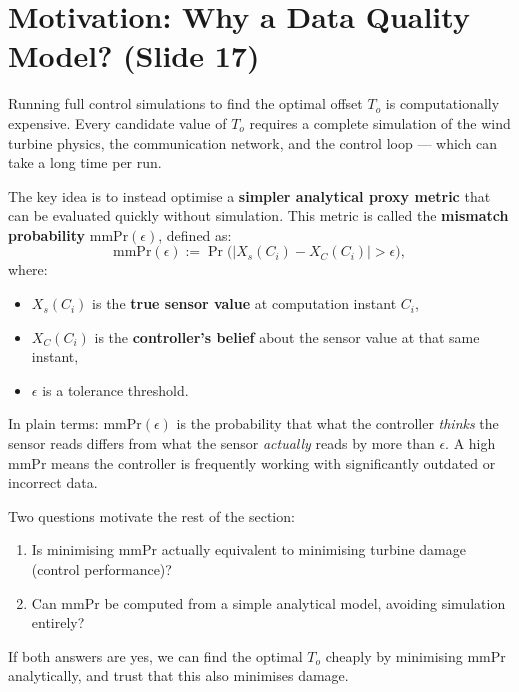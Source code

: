 \section{Motivation: Why a Data Quality Model? (Slide 17)}
 
Running full control simulations to find the optimal offset $T_o$ is
computationally expensive. Every candidate value of $T_o$ requires a
complete simulation of the wind turbine physics, the communication network,
and the control loop --- which can take a long time per run.
 
The key idea is to instead optimise a \textbf{simpler analytical proxy
metric} that can be evaluated quickly without simulation. This metric is
called the \textbf{mismatch probability} $\mathrm{mmPr}(\epsilon)$, defined
as:
\[
  \mathrm{mmPr}(\epsilon)
    := \Pr\!\bigl(|X_s(C_i) - X_C(C_i)| > \epsilon\bigr),
\]
where:
\begin{itemize}[leftmargin=2em]
  \item $X_s(C_i)$ is the \textbf{true sensor value} at computation
        instant $C_i$,
  \item $X_C(C_i)$ is the \textbf{controller's belief} about the sensor
        value at that same instant,
  \item $\epsilon$ is a tolerance threshold.
\end{itemize}
 
In plain terms: $\mathrm{mmPr}(\epsilon)$ is the probability that what the
controller \emph{thinks} the sensor reads differs from what the sensor
\emph{actually} reads by more than $\epsilon$. A high $\mathrm{mmPr}$ means
the controller is frequently working with significantly outdated or incorrect
data.
 
Two questions motivate the rest of the section:
 
\begin{enumerate}[leftmargin=2em]
  \item Is minimising $\mathrm{mmPr}$ actually equivalent to minimising
        turbine damage (control performance)?
  \item Can $\mathrm{mmPr}$ be computed from a simple analytical model,
        avoiding simulation entirely?
\end{enumerate}
 
\begin{insightbox}
If both answers are yes, we can find the optimal $T_o$ cheaply by minimising
$\mathrm{mmPr}$ analytically, and trust that this also minimises damage.
\end{insightbox}
 
